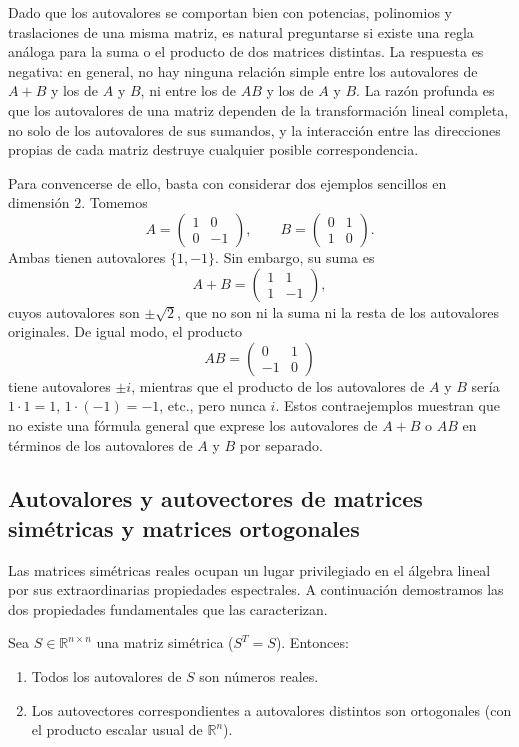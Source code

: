 Dado que los autovalores se comportan bien con potencias, polinomios y traslaciones de una misma matriz, es natural preguntarse si existe una regla análoga para la suma o el producto de dos matrices distintas. La respuesta es negativa: en general, no hay ninguna relación simple entre los autovalores de $A+B$ y los de $A$ y $B$, ni entre los de $AB$ y los de $A$ y $B$. La razón profunda es que los autovalores de una matriz dependen de la transformación lineal completa, no solo de los autovalores de sus sumandos, y la interacción entre las direcciones propias de cada matriz destruye cualquier posible correspondencia.

Para convencerse de ello, basta con considerar dos ejemplos sencillos en dimensión $2$. Tomemos 
\[
A = \begin{pmatrix} 1 & 0 \\ 0 & -1 \end{pmatrix}, \qquad 
B = \begin{pmatrix} 0 & 1 \\ 1 & 0 \end{pmatrix}.
\]
Ambas tienen autovalores $\{1,-1\}$. Sin embargo, su suma es 
\[
A+B = \begin{pmatrix} 1 & 1 \\ 1 & -1 \end{pmatrix},
\]
cuyos autovalores son $\pm\sqrt{2}$, que no son ni la suma ni la resta de los autovalores originales. De igual modo, el producto
\[
AB = \begin{pmatrix} 0 & 1 \\ -1 & 0 \end{pmatrix}
\]
tiene autovalores $\pm i$, mientras que el producto de los autovalores de $A$ y $B$ sería $1\cdot 1=1$, $1\cdot(-1)=-1$, etc., pero nunca $i$. Estos contraejemplos muestran que no existe una fórmula general que exprese los autovalores de $A+B$ o $AB$ en términos de los autovalores de $A$ y $B$ por separado. 

\subsection{Autovalores y autovectores de matrices simétricas y matrices ortogonales}

Las matrices simétricas reales ocupan un lugar privilegiado en el álgebra lineal por sus extraordinarias propiedades espectrales. A continuación demostramos las dos propiedades fundamentales que las caracterizan.

\begin{thm}
Sea $S\in\mathbb{R}^{n\times n}$ una matriz simétrica ($S^T = S$). Entonces:
\begin{enumerate}
\item Todos los autovalores de $S$ son números reales.
\item Los autovectores correspondientes a autovalores distintos son ortogonales (con el producto escalar usual de $\mathbb{R}^n$).
\end{enumerate}
\end{thm}

